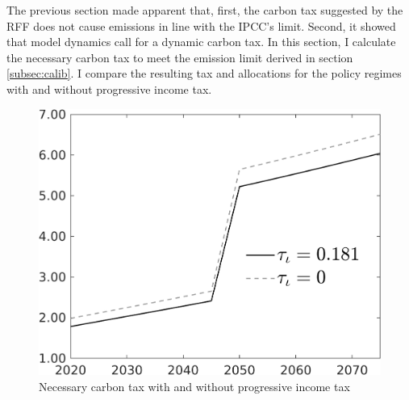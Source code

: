  The previous section made apparent that, first, the carbon tax suggested by the RFF does not cause emissions in line with the IPCC's limit.  Second, it showed that model dynamics call for a dynamic carbon tax. In this section, I calculate the necessary carbon tax to meet the emission limit derived in section \ref{subsec:calib}. I compare the resulting tax and allocations for the policy regimes with and without progressive income tax. 
 

 \begin{figure}[h!!]
 	\centering
 	\caption{Necessary carbon tax with and without progressive income tax  }\label{fig:Limit_nsk0_xgr0_know}		
 	\begin{minipage}[]{0.32\textwidth}
 		\includegraphics[width=1\textwidth]{../../codding_model/own_basedOnFried/optimalPol_010922_revision/figures/all_13Sept22/CompTauf_bytaul_Reg0_tauf_spillover0_nsk0_xgr0_knspil0_sep0_LFlimit1_emsbase0_countec0_GovRev0_etaa0.79_lgd1.png}
 	\end{minipage}		\begin{minipage}[]{0.32\textwidth}

\end{minipage}
\end{figure}
